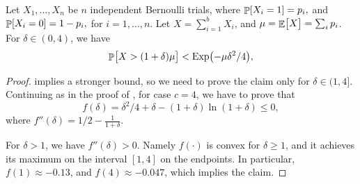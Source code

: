\begin{fragment}{}
    \begin{lemma}
        Let $X_1, \ldots, X_n$ be $n$ independent Bernoulli trials, where
        \begin{math}
            \Prob{  X_i = 1 } =p_i,
        \end{math}
        and 
        \begin{math}
            \Prob{  X_i = 0 } =1- p_i,
        \end{math}
        for $i=1,\ldots, n$.  Let $X = \sum_{i=1}^{b} X_i$, and
        $\mu = \mathop{\mathbb{E}}\!\left[ {\bigl. X} \right] = \sum_i p_i$.  For $\delta \in (0,4)$,
        we have
        \begin{equation*}
            \Prob{ \bigl. X > (1+\delta)\mu } < \Exp \pth{-\mu \delta^2 /
               4},            
        \end{equation*}
    \end{lemma}
\end{fragment}
\begin{proof}
     implies a stronger bound, so we
    need to prove the claim only for $\delta \in (1,4]$.
    Continuing as in the proof of ,
    for case $c=4$, we have to prove that 
    \begin{equation*}
        f(\delta) = \delta^2/4 + \delta -(1+\delta) \ln(1+\delta)
        \leq 0,
    \end{equation*}
    where
    \begin{math}
        f''(\delta) = 1/2 - \frac{1}{1+\delta}.
    \end{math}
    
    For $\delta > 1$, we have $f''(\delta) > 0$. Namely $f(\cdot)$ is
    convex for $\delta \geq 1$, and it achieves its maximum on the
    interval $[1,4]$ on the endpoints. In particular,
    $f(1)\approx -0.13$, and $f(4) \approx -0.047$, which implies the
    claim.
\end{proof}


